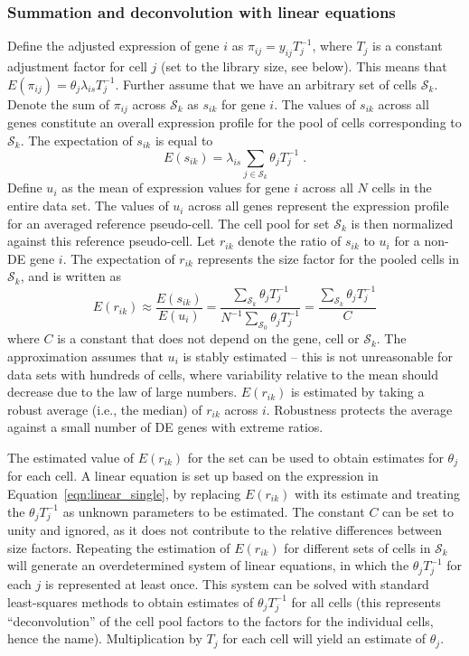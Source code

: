 \documentclass{bmcart}
\begin{document}
\subsubsection*{Summation and deconvolution with linear equations}
Define the adjusted expression of gene $i$ as $\pi_{ij} = y_{ij}T_j^{-1}$, where $T_j$ is a constant adjustment factor for cell $j$ (set to the library size, see below).
This means that $E(\pi_{ij}) =\theta_j\lambda_{is} T_j^{-1}$.
Further assume that we have an arbitrary set of cells $\mathcal{S}_k$.
Denote the sum of $\pi_{ij}$ across $\mathcal{S}_k$ as $s_{ik}$ for gene $i$.
The values of $s_{ik}$ across all genes constitute an overall expression profile for the pool of cells corresponding to $\mathcal{S}_k$.
The expectation of $s_{ik}$ is equal to 
\[
    E(s_{ik}) = \lambda_{is} \sum_{j \in \mathcal{S}_k} \theta_j T_j^{-1}\;.
\]
Define $u_{i}$ as the mean of expression values for gene $i$ across all $N$ cells in the entire data set.
The values of $u_{i}$ across all genes represent the expression profile for an averaged reference pseudo-cell.
The cell pool for set $\mathcal{S}_k$ is then normalized against this reference pseudo-cell.
Let $r_{ik}$ denote the ratio of $s_{ik}$ to $u_{i}$ for a non-DE gene $i$.
The expectation of $r_{ik}$ represents the size factor for the pooled cells in $\mathcal{S}_k$, and is written as
\begin{equation}
    E(r_{ik}) \approx \frac{E(s_{ik})}{E(u_{i})} 
    = \frac{\sum_{\mathcal{S}_k} \theta_j T_j^{-1}}{ N^{-1} \sum_{\mathcal{S}_0} \theta_j T_j^{-1}} 
    = \frac{\sum_{\mathcal{S}_k} \theta_j T_j^{-1}}{C}
    \label{eqn:linear_single}
\end{equation}
where $C$ is a constant that does not depend on the gene, cell or $\mathcal{S}_k$.
The approximation assumes that $u_{i}$ is stably estimated 
    -- this is not unreasonable for data sets with hundreds of cells, where variability relative to the mean should decrease due to the law of large numbers.
$E(r_{ik})$ is estimated by taking a robust average (i.e., the median) of $r_{ik}$ across $i$.
Robustness protects the average against a small number of DE genes with extreme ratios.

The estimated value of $E(r_{ik})$ for the set can be used to obtain estimates for $\theta_j$ for each cell.
A linear equation is set up based on the expression in Equation~\ref{eqn:linear_single}, 
by replacing $E(r_{ik})$ with its estimate and treating the $\theta_j T_j^{-1}$ as unknown parameters to be estimated.
The constant $C$ can be set to unity and ignored, as it does not contribute to the relative differences between size factors.
Repeating the estimation of $E(r_{ik})$ for different sets of cells in $\mathcal{S}_{k}$ will generate an overdetermined system of linear equations, 
    in which the $\theta_j T_j^{-1}$ for each $j$ is represented at least once.
This system can be solved with standard least-squares methods to obtain estimates of $\theta_j T_j^{-1}$ for all cells 
    (this represents ``deconvolution'' of the cell pool factors to the factors for the individual cells, hence the name).
Multiplication by $T_j$ for each cell will yield an estimate of $\theta_j$.
\end{document}
